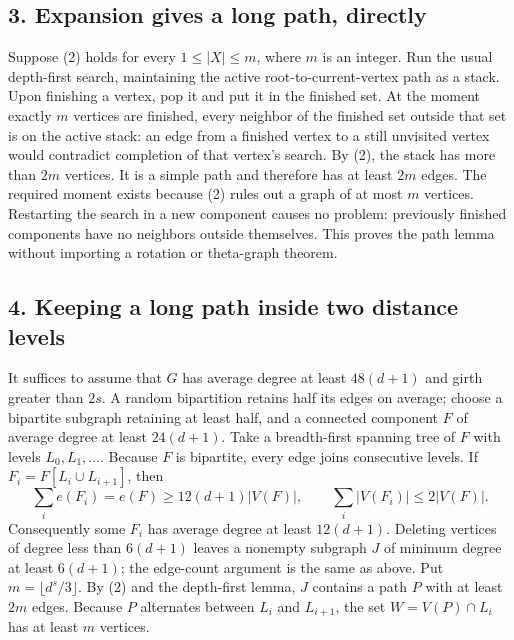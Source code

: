 \subsection*{3. Expansion gives a long path, directly}
Suppose (2) holds for every $1\le|X|\le m$, where $m$ is an integer. Run the usual depth-first search, maintaining the active root-to-current-vertex path as a stack. Upon finishing a vertex, pop it and put it in the finished set. At the moment exactly $m$ vertices are finished, every neighbor of the finished set outside that set is on the active stack: an edge from a finished vertex to a still unvisited vertex would contradict completion of that vertex's search. By (2), the stack has more than $2m$ vertices. It is a simple path and therefore has at least $2m$ edges.
The required moment exists because (2) rules out a graph of at most $m$ vertices. Restarting the search in a new component causes no problem: previously finished components have no neighbors outside themselves. This proves the path lemma without importing a rotation or theta-graph theorem.
\subsection*{4. Keeping a long path inside two distance levels}
It suffices to assume that $G$ has average degree at least $48(d+1)$ and girth greater than $2s$. A random bipartition retains half its edges on average; choose a bipartite subgraph retaining at least half, and a connected component $F$ of average degree at least $24(d+1)$.
Take a breadth-first spanning tree of $F$ with levels $L_0,L_1,\ldots$. Because $F$ is bipartite, every edge joins consecutive levels. If $F_i=F[L_i\cup L_{i+1}]$, then
\[
 \sum_i e(F_i)=e(F)\ge12(d+1)|V(F)|,
 \qquad \sum_i|V(F_i)|\le2|V(F)|.
\]
Consequently some $F_i$ has average degree at least $12(d+1)$. Deleting vertices of degree less than $6(d+1)$ leaves a nonempty subgraph $J$ of minimum degree at least $6(d+1)$; the edge-count argument is the same as above.
Put $m=\lfloor d^s/3\rfloor$. By (2) and the depth-first lemma, $J$ contains a path $P$ with at least $2m$ edges. Because $P$ alternates between $L_i$ and $L_{i+1}$, the set $W=V(P)\cap L_i$ has at least $m$ vertices.
